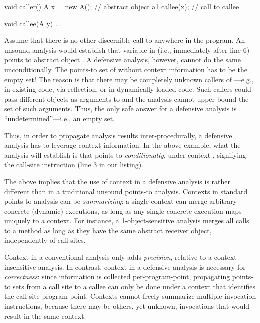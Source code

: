\vspace{-3mm}\begin{minipage}[l]{5.1in}
\begin{javacode}
void caller() { 
  A x = new A(); // abstract object a1
  callee(x); // call to callee
}

void callee(A y) {
  ...
}
\end{javacode}
\end{minipage}

Assume that there is no other discernible call to  anywhere in the
program. An unsound analysis would establish that variable  in
 (i.e., immediately after line 6) points to abstract object
. A defensive analysis, however, cannot do the same
unconditionally. The points-to set of  without context
information has to be the empty set! The reason is that there may be
completely unknown callers of ---e.g., in existing code, via
reflection, or in dynamically loaded code. Such callers could pass
different objects as arguments to  and the analysis cannot
upper-bound the set of such arguments. Thus, the only safe answer for
a defensive analysis is ``undetermined''---i.e., an empty set.

Thus, in order to propagate analysis results inter-procedurally, a defensive
analysis has to leverage context information. In the above
example, what the analysis will establish is that  points to
 \emph{conditionally}, under context , signifying the
call-site instruction (line 3 in our listing). 

The above implies that the use of context in a defensive analysis is
rather different than in a traditional unsound points-to analysis.
Contexts in standard points-to analysis can be \emph{summarizing}: a
single context can merge arbitrary concrete (dynamic) executions, as
long as any single concrete execution maps uniquely to a context. For
instance, a 1-object-sensitive analysis \cite{1044835} merges all
calls to a method as long as they have the same abstract receiver
object, independently of call sites.

Context in a conventional analysis only adds \emph{precision},
relative to a context-insensitive analysis. In contrast, context in a
defensive analysis is necessary for \emph{correctness}: since
information is collected per-program-point, propagating points-to sets
from a call site to a callee can only be done under a context that
identifies the call-site program point. Contexts cannot freely
summarize multiple invocation instructions, because there may be
others, yet unknown, invocations that would result in the same
context.

